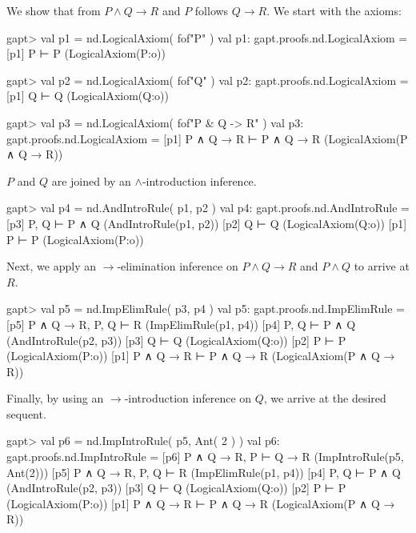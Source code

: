 \documentclass[a4paper,11pt]{book}
\newcommand{\impl}{\to} %
\renewcommand{\land}{\wedge}
\begin{document}
We show that from $P \land Q \impl R$ and $P$ follows $Q \impl R$. We start with
the axioms:

\begin{clilisting}
gapt> val p1 = nd.LogicalAxiom( fof"P" )
val p1: gapt.proofs.nd.LogicalAxiom =
[p1] P ⊢ P    (LogicalAxiom(P:o))

gapt> val p2 = nd.LogicalAxiom( fof"Q" )
val p2: gapt.proofs.nd.LogicalAxiom =
[p1] Q ⊢ Q    (LogicalAxiom(Q:o))

gapt> val p3 = nd.LogicalAxiom( fof"P & Q -> R" )
val p3: gapt.proofs.nd.LogicalAxiom =
[p1] P ∧ Q → R ⊢ P ∧ Q → R    (LogicalAxiom(P ∧ Q → R))

\end{clilisting}

$P$ and $Q$ are joined by an $\land$-introduction inference.

\begin{clilisting}
gapt> val p4 = nd.AndIntroRule( p1, p2 )
val p4: gapt.proofs.nd.AndIntroRule =
[p3] P, Q ⊢ P ∧ Q    (AndIntroRule(p1, p2))
[p2] Q ⊢ Q    (LogicalAxiom(Q:o))
[p1] P ⊢ P    (LogicalAxiom(P:o))

\end{clilisting}

Next, we apply an $\impl$-elimination inference on $P \land Q \impl R$
and $P \land Q$ to arrive at $R$.

\begin{clilisting}
gapt> val p5 = nd.ImpElimRule( p3, p4 )
val p5: gapt.proofs.nd.ImpElimRule =
[p5] P ∧ Q → R, P, Q ⊢ R    (ImpElimRule(p1, p4))
[p4] P, Q ⊢ P ∧ Q    (AndIntroRule(p2, p3))
[p3] Q ⊢ Q    (LogicalAxiom(Q:o))
[p2] P ⊢ P    (LogicalAxiom(P:o))
[p1] P ∧ Q → R ⊢ P ∧ Q → R    (LogicalAxiom(P ∧ Q → R))

\end{clilisting}

Finally, by using an $\impl$-introduction inference on $Q$, we arrive
at the desired sequent.

\begin{clilisting}
gapt> val p6 = nd.ImpIntroRule( p5, Ant( 2 ) )
val p6: gapt.proofs.nd.ImpIntroRule =
[p6] P ∧ Q → R, P ⊢ Q → R    (ImpIntroRule(p5, Ant(2)))
[p5] P ∧ Q → R, P, Q ⊢ R    (ImpElimRule(p1, p4))
[p4] P, Q ⊢ P ∧ Q    (AndIntroRule(p2, p3))
[p3] Q ⊢ Q    (LogicalAxiom(Q:o))
[p2] P ⊢ P    (LogicalAxiom(P:o))
[p1] P ∧ Q → R ⊢ P ∧ Q → R    (LogicalAxiom(P ∧ Q → R))

\end{clilisting}
\end{document}
